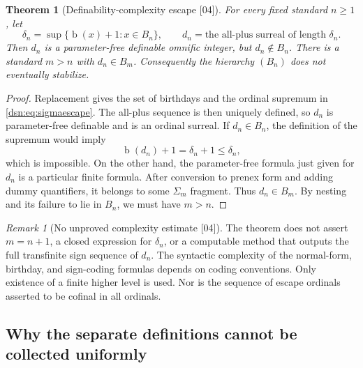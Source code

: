 \documentclass[11pt,a4paper]{article}
\numberwithin{equation}{section}
\newtheorem{theorem}{Theorem}[section]
\theoremstyle{definition}
\theoremstyle{remark}
\newtheorem{remark}[remark]{Remark}
\newcommand{\bd}{\operatorname{b}}
\newcommand{\src}[1]{\textup{\textsf{\small[#1]}}}
\begin{document}
\begin{theorem}[Definability-complexity escape \src{04}]\label{dsn:thm:sigmaescape}
For every fixed standard $n\geq1$, let
\begin{equation}\label{dsn:eq:sigmaescape}
 \delta_n=\sup\{\bd(x)+1:x\in B_n\},
 \qquad d_n=\text{the all-plus surreal of length }\delta_n.
\end{equation}
Then $d_n$ is a parameter-free definable omnific integer, but
$d_n\notin B_n$. There is a standard $m>n$ with $d_n\in B_m$.
Consequently the hierarchy $(B_n)$ does not eventually stabilize.
\end{theorem}
\begin{proof}
Replacement gives the set of birthdays and the ordinal supremum in
\eqref{dsn:eq:sigmaescape}. The all-plus sequence is then uniquely defined,
so $d_n$ is parameter-free definable and is an ordinal surreal.
If $d_n\in B_n$, the definition of the supremum would imply
\[
 \bd(d_n)+1=\delta_n+1\leq\delta_n,
\]
which is impossible. On the other hand, the parameter-free formula
just given for $d_n$ is a particular finite formula. After conversion
to prenex form and adding dummy quantifiers, it belongs to some
$\Sigma_m$ fragment. Thus $d_n\in B_m$. By nesting and its failure
to lie in $B_n$, we must have $m>n$.
\end{proof}

\begin{remark}[No unproved complexity estimate \src{04}]
The theorem does not assert $m=n+1$, a closed expression for
$\delta_n$, or a computable method that outputs the full transfinite
sign sequence of $d_n$. The syntactic complexity of the normal-form,
birthday, and sign-coding formulas depends on coding conventions.
Only existence of a finite higher level is used. Nor is the sequence
of escape ordinals asserted to be cofinal in all ordinals.
\end{remark}

\subsection{Why the separate definitions cannot be collected uniformly}
\end{document}
